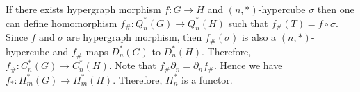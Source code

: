 \documentclass[11pt]{amsart}
\newtheorem{prop}[subsection]{Proposition}
\begin{document}
If there exists hypergraph morphism $f:G\rightarrow H$ and  $(n,*)$-hypercube $\sigma$ then one can define homomorphism $f_{\#}: Q_n^*(G)\rightarrow  Q_n^*(H)$ such that $f_{\#}(T)=f\circ \sigma$. Since $f$ and $\sigma$ are hypergraph morphism, then $f_{\#}(\sigma)$ is also a $(n,*)$-hypercube and $f_{\#}$ maps $ D_n^*(G)$ to $ D_n^*(H)$. Therefore, $f_{\#}: C_n^*(G)\rightarrow  C_n^*(H)$.
Note that $f_{\#} \partial_n=\partial_{n}f_{\#}$. Hence we have $f_{*}: H_m^*(G) \rightarrow  H_m^*(H)$. Therefore, $H_n^*$ is a functor.



			
\end{document}
